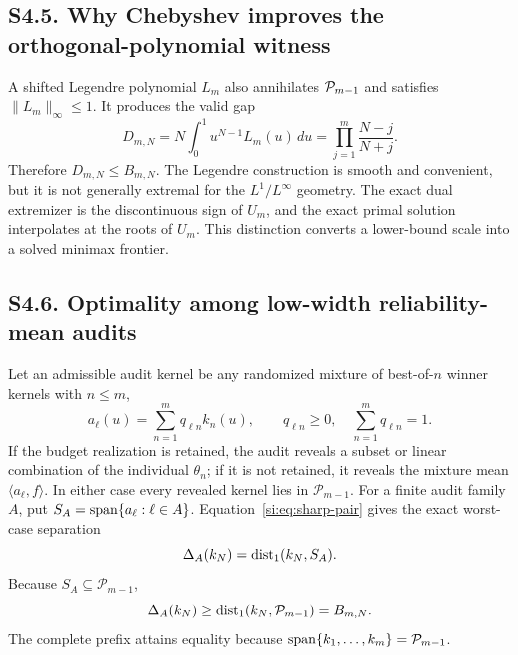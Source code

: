\subsection*{S4.5. Why Chebyshev improves the orthogonal-polynomial witness}

A shifted Legendre polynomial $L_m$ also annihilates $\mathcal P_{m-1}$ and satisfies $\|L_m\|_\infty\le1$. It produces the valid gap
\begin{equation}
D_{m,N}=N\int_0^1u^{N-1}L_m(u)\,du
=\prod_{j=1}^m\frac{N-j}{N+j}.
\label{si:eq:legendre-gap}
\end{equation}
Therefore $D_{m,N}\le B_{m,N}$. The Legendre construction is smooth and convenient, but it is not generally extremal for the $L^1/L^\infty$ geometry. The exact dual extremizer is the discontinuous sign of $U_m$, and the exact primal solution interpolates at the roots of $U_m$. This distinction converts a lower-bound scale into a solved minimax frontier.

\subsection*{S4.6. Optimality among low-width reliability-mean audits}

Let an admissible audit kernel be any randomized mixture of best-of-$n$ winner kernels with $n\le m$,
\begin{equation}
a_\ell(u)=\sum_{n=1}^m q_{\ell n}k_n(u),
\qquad q_{\ell n}\ge0,
\quad \sum_{n=1}^m q_{\ell n}=1.
\label{si:eq:mixed-audit}
\end{equation}
If the budget realization is retained, the audit reveals a subset or linear combination of the individual $\theta_n$; if it is not retained, it reveals the mixture mean $\langle a_\ell,f\rangle$. In either case every revealed kernel lies in $\mathcal P_{m-1}$. For a finite audit family $A$, put $S_A=\operatorname{span}\{a_\ell:\ell\in A\}$. Equation~\ref{si:eq:sharp-pair} gives the exact worst-case separation
\begin{equation}
\Delta_A(k_N)=\operatorname{dist}_1(k_N,S_A).
\label{si:eq:audit-family-distance}
\end{equation}
Because $S_A\subseteq\mathcal P_{m-1}$,
\begin{equation}
\Delta_A(k_N)
\ge \operatorname{dist}_1(k_N,\mathcal P_{m-1})
=B_{m,N}.
\label{si:eq:audit-family-lower}
\end{equation}
The complete prefix attains equality because $\operatorname{span}\{k_1,\ldots,k_m\}=\mathcal P_{m-1}$.

